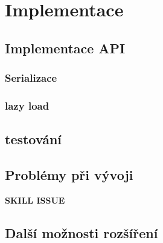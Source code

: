 \chapter{Implementace}

\section{Implementace API}

\subsection{Serializace}
\subsection{lazy load}
\section{testování}

\section{Problémy při vývoji}
\textbf{SKILL ISSUE}
\section{Další možnosti rozšíření}